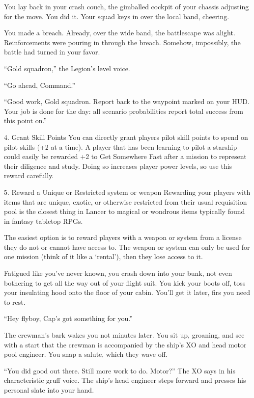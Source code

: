 You lay back in your crash couch, the gimballed cockpit of your chassis adjusting for the move.
You did it. Your squad keys in over the local band, cheering.

You made a breach. Already, over the wide band, the battlescape was alight. Reinforcements
were pouring in through the breach. Somehow, impossibly, the battle had turned in your favor.

“Gold squadron,” the Legion’s level voice.

“Go ahead, Command.”

“Good work, Gold squadron. Report back to the waypoint marked on your HUD. Your job is done
for the day: all scenario probabilities report total success from this point on.”


4. Grant Skill Points
You can directly grant players pilot skill points to spend on pilot skills (+2 at a time). A player that
has been learning to pilot a starship could easily be rewarded +2 to Get Somewhere Fast after a
mission to represent their diligence and study. Doing so increases player power levels, so use
this reward carefully.


5. Reward a Unique or Restricted system or weapon
Rewarding your players with items that are unique, exotic, or otherwise restricted from their usual
requisition pool is the closest thing in Lancer to magical or wondrous items typically found in
fantasy tabletop RPGs.


The easiest option is to reward players with a weapon or system from a license they do not
or cannot have access to. The weapon or system can only be used for one mission (think of it
like a ‘rental’), then they lose access to it.


Fatigued like you’ve never known, you crash down into your bunk, not even bothering to get all
the way out of your flight suit. You kick your boots off, toss your insulating hood onto the floor of
your cabin. You’ll get it later, firs you need to rest.

“Hey flyboy, Cap’s got something for you.”

The crewman’s bark wakes you not minutes later. You sit up, groaning, and see with a start that
the crewman is accompanied by the ship’s XO and head motor pool engineer. You snap a salute,
which they wave off.

“You did good out there. Still more work to do. Motor?” The XO says in his characteristic gruff
voice. The ship’s head engineer steps forward and presses his personal slate into your hand.

